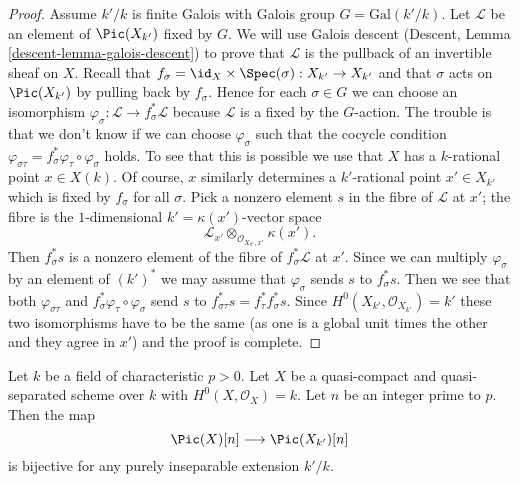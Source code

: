 \begin{proof}
\medskip\noindent
Assume $k'/k$ is finite Galois with Galois group $G = \text{Gal}(k'/k)$.
Let $\mathcal{L}$ be an element of $\Pic(X_{k'})$ fixed by $G$.
We will use Galois descent (Descent, Lemma \ref{descent-lemma-galois-descent})
to prove that $\mathcal{L}$ is the pullback of an invertible sheaf on $X$.
Recall that $f_\sigma = \id_X \times \Spec(\sigma) : X_{k'} \to X_{k'}$
and that $\sigma$ acts on $\Pic(X_{k'})$ by pulling back by $f_\sigma$.
Hence for each $\sigma \in G$ we can choose an isomorphism
$\varphi_\sigma : \mathcal{L} \to f_\sigma^*\mathcal{L}$
because $\mathcal{L}$ is a fixed by the $G$-action.
The trouble is that we don't know if we can choose
$\varphi_\sigma$ such that the cocycle condition
$\varphi_{\sigma\tau} = f_\sigma^*\varphi_\tau \circ \varphi_\sigma$
holds. To see that this is possible we use that $X$ has a $k$-rational point
$x \in X(k)$. Of course, $x$ similarly determines a $k'$-rational point
$x' \in X_{k'}$ which is fixed by $f_\sigma$ for all $\sigma$.
Pick a nonzero element $s$ in the fibre of $\mathcal{L}$ at $x'$;
the fibre is the $1$-dimensional $k' = \kappa(x')$-vector space
$$
\mathcal{L}_{x'} \otimes_{\mathcal{O}_{X_{k'}, x'}} \kappa(x').
$$
Then $f_\sigma^*s$ is a nonzero element of the fibre of
$f_\sigma^*\mathcal{L}$ at $x'$. Since we can multiply $\varphi_\sigma$
by an element of $(k')^*$ we may assume that $\varphi_\sigma$ sends
$s$ to $f_\sigma^*s$. Then we see that both $\varphi_{\sigma\tau}$ and
$f_\sigma^*\varphi_\tau \circ \varphi_\sigma$
send $s$ to $f_{\sigma\tau}^*s = f_\tau^*f_\sigma^*s$.
Since $H^0(X_{k'}, \mathcal{O}_{X_{k'}}) = k'$ these two isomorphisms
have to be the same (as one is a global unit times the other
and they agree in $x'$) and the proof is complete.
\end{proof}

\begin{lemma}
\label{lemma-torsion-descends}
Let $k$ be a field of characteristic $p > 0$. Let $X$ be a
quasi-compact and quasi-separated scheme over $k$ with
$H^0(X, \mathcal{O}_X) = k$. Let $n$ be an integer prime to $p$.
Then the map
$$
\Pic(X)[n] \longrightarrow \Pic(X_{k'})[n]
$$
is bijective for any purely inseparable extension $k'/k$.
\end{lemma}

